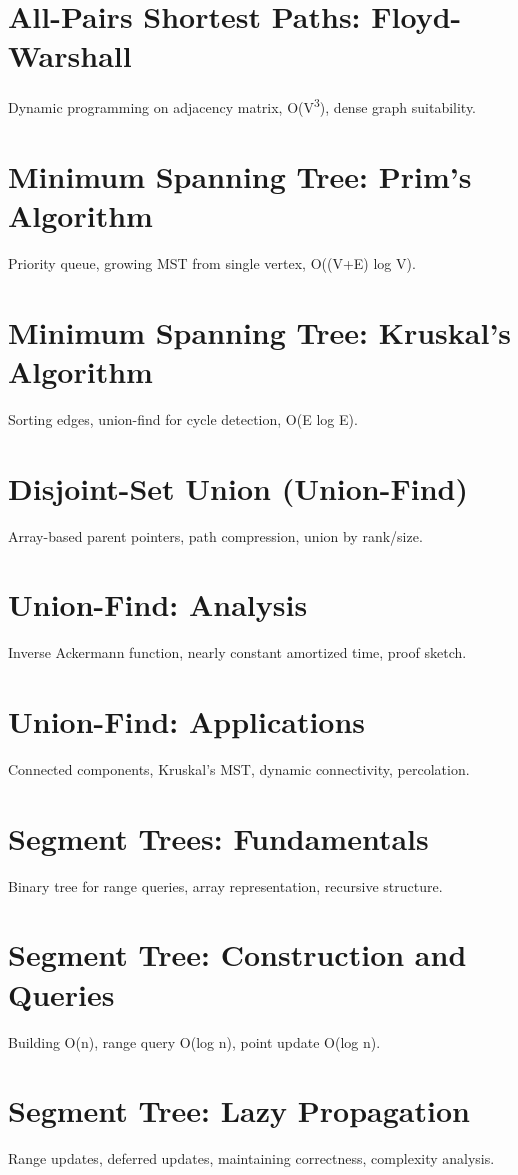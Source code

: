 \chapter{All-Pairs Shortest Paths: Floyd-Warshall}
Dynamic programming on adjacency matrix, O(V\textsuperscript{3}), dense graph suitability.

\chapter{Minimum Spanning Tree: Prim's Algorithm}
Priority queue, growing MST from single vertex, O((V+E) log V).

\chapter{Minimum Spanning Tree: Kruskal's Algorithm}
Sorting edges, union-find for cycle detection, O(E log E).

\chapter{Disjoint-Set Union (Union-Find)}
Array-based parent pointers, path compression, union by rank/size.

\chapter{Union-Find: Analysis}
Inverse Ackermann function, nearly constant amortized time, proof sketch.

\chapter{Union-Find: Applications}
Connected components, Kruskal's MST, dynamic connectivity, percolation.


\chapter{Segment Trees: Fundamentals}
Binary tree for range queries, array representation, recursive structure.

\chapter{Segment Tree: Construction and Queries}
Building O(n), range query O(log n), point update O(log n).

\chapter{Segment Tree: Lazy Propagation}
Range updates, deferred updates, maintaining correctness, complexity analysis.

